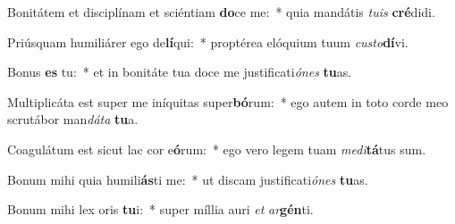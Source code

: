 \item Bonitátem et disciplínam et sciéntiam \textbf{do}ce me:~* quia mandátis \textit{tu}\textit{is} \textbf{cré}didi.
\item Priúsquam humiliárer ego de\textbf{lí}qui:~* proptérea elóquium tuum \textit{cus}\textit{to}\textbf{dí}vi.
\item Bonus \textbf{es} tu:~* et in bonitáte tua doce me justificati\textit{ó}\textit{nes} \textbf{tu}as.
\item Multiplicáta est super me iníquitas super\textbf{bó}rum:~* ego autem in toto corde meo scrutábor man\textit{dá}\textit{ta} \textbf{tu}a.
\item Coagulátum est sicut lac cor e\textbf{ó}rum:~* ego vero legem tuam \textit{me}\textit{di}\textbf{tá}tus sum.
\item Bonum mihi quia humili\textbf{ás}ti me:~* ut discam justificati\textit{ó}\textit{nes} \textbf{tu}as.
\item Bonum mihi lex oris \textbf{tu}i:~* super míllia auri \textit{et} \textit{ar}\textbf{gén}ti.
